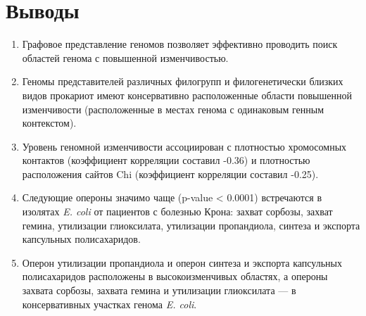 \section*{Выводы} 
\begin{enumerate}
  \item Графовое представление геномов позволяет эффективно проводить поиск областей генома с повышенной изменчивостью.

	\item Геномы представителей различных филогрупп и филогенетически близких видов прокариот имеют консервативно расположенные области повышенной изменчивости (расположенные в местах генома с одинаковым генным контекстом).

 	\item Уровень геномной изменчивости ассоциирован с плотностью хромосомных контактов (коэффициент корреляции составил -0.36) и плотностью расположения сайтов Chi (коэффициент корреляции составил -0.25).

	\item Следующие опероны значимо чаще (p-value < 0.0001) встречаются в изолятах \textit{E. coli} от пациентов с болезнью Крона: захват сорбозы, захват гемина, утилизации глиоксилата, утилизации пропандиола, синтеза и экспорта капсульных полисахаридов.

  \item Оперон утилизации пропандиола и оперон синтеза и экспорта капсульных полисахаридов расположены в высокоизменчивых областях, а опероны захвата сорбозы, захвата гемина и утилизации глиоксилата --- в консервативных участках генома \textit{E. coli}.

\end{enumerate}



